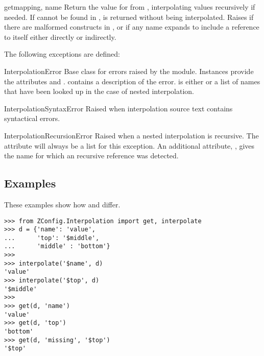 \documentclass{howto}
\begin{document}
\begin{funcdesc}{get}{mapping, name}
  Return the value for  from , interpolating
  values recursively if needed.  If  cannot be found in
  ,  is returned without being
  interpolated.
  Raises  if there are malformed
  constructs in , or  if
  any name expands to include a reference to itself either directly or
  indirectly.
\end{funcdesc}

The following exceptions are defined:

\begin{excdesc}{InterpolationError}
  Base class for errors raised by the 
  module.  Instances provide the attributes  and
  .   contains a description of the
  error.   is either  or a list of names
  that have been looked up in the case of nested interpolation.
\end{excdesc}

\begin{excdesc}{InterpolationSyntaxError}
  Raised when interpolation source text contains syntactical errors.
\end{excdesc}

\begin{excdesc}{InterpolationRecursionError}
  Raised when a nested interpolation is recursive.  The
   attribute will always be a list for this
  exception.  An additional attribute, , gives the name
  for which an recursive reference was detected.
\end{excdesc}


\subsection{Examples}

These examples show how  and 
differ.

\begin{verbatim}
>>> from ZConfig.Interpolation import get, interpolate
>>> d = {'name': 'value',
...      'top': '$middle',
...      'middle' : 'bottom'}
>>>
>>> interpolate('$name', d)
'value'
>>> interpolate('$top', d)
'$middle'
>>>
>>> get(d, 'name')
'value'
>>> get(d, 'top')
'bottom'
>>> get(d, 'missing', '$top')
'$top'
\end{verbatim}
\end{document}
